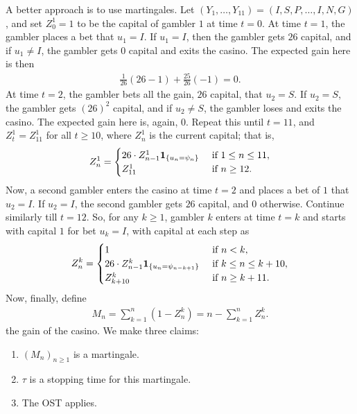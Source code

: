 A better approach is to use martingales. Let $(Y_{1},\ldots,Y_{11}) = (I,S,P,\ldots,I,N,G)$, and set $Z_{0}^{1} = 1$ to be the capital of gambler $1$ at time $t = 0$. At time $t = 1$, the gambler places a bet that $u_{1} = I$. If $u_{1} = I$, then the gambler gets $26$ capital, and if $u_{1} \neq I$, the gambler gets $0$ capital and exits the casino. The expected gain here is then
\begin{align}
    \frac{1}{26}(26-1) + \frac{25}{26}(-1) = 0.
\end{align}
At time $t = 2$, the gambler bets all the gain, $26$ capital, that $u_{2} = S$. If $u_{2} = S$, the gambler gets $(26)^{2}$ capital, and if $u_{2} \neq S$, the gambler loses and exits the casino. The expected gain here is, again, $0$. Repeat this until $t = 11$, and $Z_{t}^{1} = Z_{11}^{1}$ for all $t \geq 10$, where $Z_{n}^{1}$ is the current capital; that is,
\begin{align}
    Z_{n}^{1} = \begin{cases}
        26 \cdot Z_{n-1}^{1} \textbf{1}_{\{u_{n} = \psi_{n}\}} &\text{ if } 1 \leq n \leq 11,\\
        Z_{11}^{1} &\text{ if } n \geq 12.
    \end{cases}
\end{align}
Now, a second gambler enters the casino at time $t = 2$ and places a bet of $1$ that $u_{2} = I$. If $u_{2} = I$, the second gambler gets $26$ capital, and $0$ otherwise. Continue similarly till $t = 12$. So, for any $k \geq 1$, gambler $k$ enters at time $t = k$ and starts with capital $1$ for bet $u_{k} = I$, with capital at each step as
\begin{align}
    Z_{n}^{k} = \begin{cases}
        1 &\text{ if } n < k,\\
        26 \cdot Z_{n-1}^{k} \textbf{1}_{\{u_{n}=\psi_{n-k+1}\}} &\text{ if } k \leq n \leq k+10,\\
        Z_{k+10}^{k} &\text{ if } n \geq k + 11.
    \end{cases}
\end{align}
Now, finally, define
\begin{align}
    M_{n} = \sum_{k=1}^{n}(1-Z_{n}^{k}) = n - \sum_{k=1}^{n}Z_{n}^{k}.
\end{align}
the gain of the casino. We make three claims:
\begin{enumerate}
    \item $(M_{n})_{n \geq 1}$ is a martingale.
    \item $\tau$ is a stopping time for this martingale.
    \item The OST applies.
\end{enumerate}
